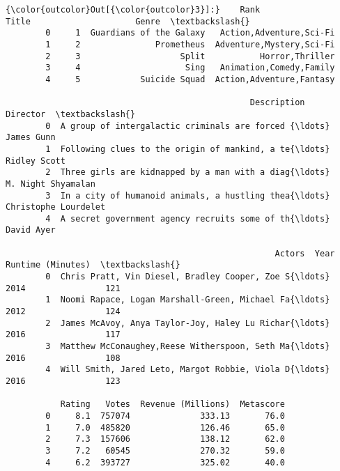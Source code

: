 \documentclass[11pt]{article}
\begin{document}
\begin{Verbatim}[commandchars=\\\{\}]
{\color{outcolor}Out[{\color{outcolor}3}]:}    Rank                    Title                     Genre  \textbackslash{}
        0     1  Guardians of the Galaxy   Action,Adventure,Sci-Fi   
        1     2               Prometheus  Adventure,Mystery,Sci-Fi   
        2     3                    Split           Horror,Thriller   
        3     4                     Sing   Animation,Comedy,Family   
        4     5            Suicide Squad  Action,Adventure,Fantasy   
        
                                                 Description              Director  \textbackslash{}
        0  A group of intergalactic criminals are forced {\ldots}            James Gunn   
        1  Following clues to the origin of mankind, a te{\ldots}          Ridley Scott   
        2  Three girls are kidnapped by a man with a diag{\ldots}    M. Night Shyamalan   
        3  In a city of humanoid animals, a hustling thea{\ldots}  Christophe Lourdelet   
        4  A secret government agency recruits some of th{\ldots}            David Ayer   
        
                                                      Actors  Year  Runtime (Minutes)  \textbackslash{}
        0  Chris Pratt, Vin Diesel, Bradley Cooper, Zoe S{\ldots}  2014                121   
        1  Noomi Rapace, Logan Marshall-Green, Michael Fa{\ldots}  2012                124   
        2  James McAvoy, Anya Taylor-Joy, Haley Lu Richar{\ldots}  2016                117   
        3  Matthew McConaughey,Reese Witherspoon, Seth Ma{\ldots}  2016                108   
        4  Will Smith, Jared Leto, Margot Robbie, Viola D{\ldots}  2016                123   
        
           Rating   Votes  Revenue (Millions)  Metascore  
        0     8.1  757074              333.13       76.0  
        1     7.0  485820              126.46       65.0  
        2     7.3  157606              138.12       62.0  
        3     7.2   60545              270.32       59.0  
        4     6.2  393727              325.02       40.0  
\end{Verbatim}
            
\end{document}
